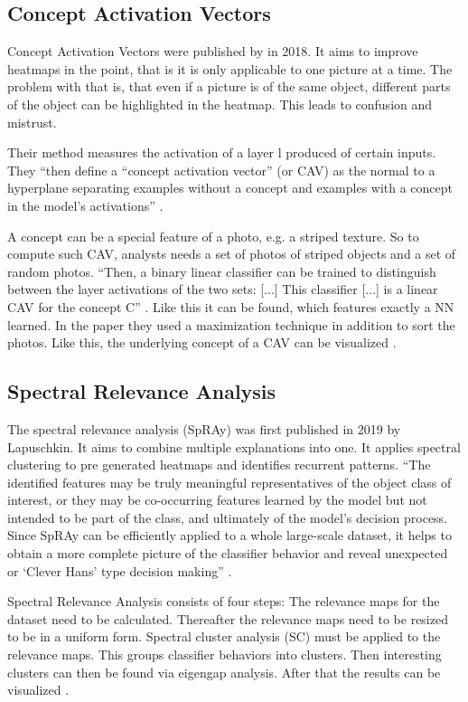 \subsection{Concept Activation Vectors}
Concept Activation Vectors were published by  in 2018. It aims to improve heatmaps in the point, that is it is only applicable to one picture at a time. The problem with that is, that even if a picture is of the same object, different parts of the object can be highlighted in the heatmap. This leads to confusion and mistrust.
\par
Their method measures the activation of a layer l produced of certain inputs. They “then define a “concept activation vector” (or CAV) as the normal to a hyperplane separating examples without a concept and examples with a concept in the model’s activations” \cite[p.3]{Kim.2018}.
\par
A concept can be a special feature of a photo, e.g. a striped texture. So to compute such CAV, analysts needs a set of photos of striped objects and a set of random photos.
“Then, a binary linear classifier can be trained to distinguish between the layer activations of the two sets: 
[...]
This classifier 
[...]
is a linear CAV for the concept C” \cite[p.3]{Kim.2018}. Like this it can be found, which features exactly a NN learned.
In the paper they used a maximization technique in addition to sort the photos. Like this, the  underlying concept of a CAV can be visualized \cite{Kim.2018}.

\subsection{Spectral Relevance Analysis}
The spectral relevance analysis (SpRAy) was first published in 2019 by Lapuschkin. It aims to combine multiple explanations into one. It applies spectral clustering to pre generated heatmaps and identifies recurrent patterns. “The identified features may be truly meaningful representatives of the object class of interest, or they may be co-occurring features learned by the model but not intended to be part of the class, and ultimately of the model’s decision process. Since SpRAy can be efficiently applied to a whole large-scale dataset, it helps to obtain a more complete picture of the classifier behavior and reveal unexpected or ‘Clever Hans’ type decision making” \cite[p.8]{Lapuschkin.2019}.
\par
Spectral Relevance Analysis consists of four steps:
The relevance maps for the dataset need to be calculated.
Thereafter the relevance maps need to be resized to be in a uniform form.
Spectral cluster analysis (SC) must be applied to the relevance maps. This groups classifier behaviors into clusters.
Then interesting clusters can then be found via eigengap analysis.
After that the results can be visualized \cite{Lapuschkin.2019}.
